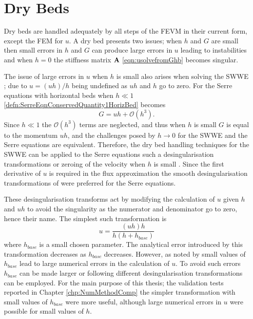 \section{Dry Beds}
\label{sec:DryBeds}
Dry beds are handled adequately by all steps of the FEVM in their current form, except the FEM for $u$. A dry bed presents two issues; when $h$ and $G$ are small then small errors in $h$ and $G$ can produce large errors in $u$ leading to instabilities and when $h=0$ the stiffness matrix $\mathbf{A}$ \eqref{eqn:usolvefromGhb} becomes singular.

The issue of large errors in $u$ when $h$ is small also arises when solving the SWWE \cite{RICCHIUTO20091071}; due to $u = (uh)/h $ being undefined as $u h $ and $h$ go to zero. For the Serre equations with horizontal beds when $h \ll 1$ \eqref{defn:SerreEqnConservedQuantity1HorizBed} becomes
\begin{equation}
G = uh + \mathcal{O}\left(h^3\right).
\end{equation}
Since $h \ll 1$ the $\mathcal{O}\left(h^3\right)$ terms are neglected, and thus when $h$ is small $G$ is equal to the momentum $uh$, and the challenges posed by $h \rightarrow 0$ for the SWWE and the Serre equations are equivalent. Therefore, the dry bed handling techniques for the SWWE can be applied to the Serre equations such a desingularisation transformations \cite{Kurganov-Petrova-2007-707} or zeroing of the velocity when $h$ is small \cite{RICCHIUTO20091071}. Since the first derivative of $u$ is required in the flux approximation the smooth desingularisation transformations of \citet{Kurganov-Petrova-2007-707} were preferred for the Serre equations.

These desingularisation transforms act by modifying the calculation of $u$ given $h$ and $uh$ to avoid the singularity as the numerator and denominator go to zero, hence their name. The simplest such transformation is
\begin{equation}
u = \frac{(uh) h}{h\left(h + h_{base}\right)}
\label{eqn:calculationofugivenuhandh}
\end{equation}
where $h_{base}$ is a small chosen parameter. The analytical error introduced by this transformation decreases as $h_{base}$ decreases. However, as noted by \citet{Kurganov-Petrova-2007-707} small values of $h_{base}$ lead to large numerical errors in the calculation of $u$. To avoid such errors $h_{base}$ can be made larger or following \citet{Kurganov-Petrova-2007-707} different desingularisation transformations can be employed. For the main purpose of this thesis; the validation tests reported in Chapter \ref{chp:NumMethodComp} the simpler transformation with small values of $h_{base}$ were more useful, although large numerical errors in $u$ were possible for small values of $h$. 

